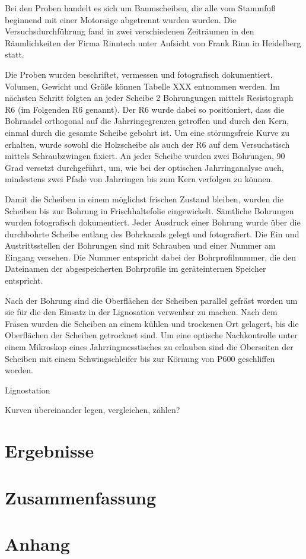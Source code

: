 \documentclass[a4paper, halfparskip]{article}
\def\SymbReg{\textsuperscript{\textregistered}}
\begin{document}
Bei den Proben handelt es sich um Baumscheiben, die alle vom Stammfuß
beginnend mit einer Motorsäge abgetrennt wurden wurden. Die
Versuchsdurchführung fand in zwei verschiedenen Zeiträumen in den
Räumlichkeiten der Firma Rinntech unter Aufsicht von Frank Rinn in Heidelberg
statt. 

Die Proben wurden beschriftet, vermessen und fotografisch dokumentiert.
Volumen, Gewicht und Größe können Tabelle XXX entnommen werden. Im nächsten
Schritt folgten an jeder Scheibe 2 Bohrungungen mittels Resistograph\SymbReg
R6 (im Folgenden R6 genannt). Der R6 wurde dabei so positioniert, dass die
Bohrnadel orthogonal auf die Jahrringegrenzen getroffen und durch den Kern,
einmal durch die gesamte Scheibe gebohrt ist. Um eine störungsfreie Kurve zu
erhalten, wurde sowohl die Holzscheibe als auch der R6 auf dem Versuchstisch
mittels Schraubzwingen fixiert. An jeder Scheibe wurden zwei Bohrungen, 90
Grad versetzt durchgeführt, um, wie bei der optischen Jahrringanalyse auch,
mindestens zwei Pfade von Jahrringen bis zum Kern verfolgen zu können. 

Damit die Scheiben in einem möglichst frischen Zustand bleiben, wurden die
Scheiben bis zur Bohrung in Frischhaltefolie eingewickelt. Sämtliche
Bohrungen wurden fotografisch dokumentiert. Jeder Ausdruck einer Bohrung wurde
über die durchbohrte Scheibe entlang des Bohrkanals gelegt und fotografiert.
Die Ein und Austrittsstellen der Bohrungen sind mit Schrauben und einer Nummer
am Eingang versehen. Die Nummer entspricht dabei der Bohrprofilnummer, die den
Dateinamen der abgespeicherten Bohrprofile im geräteinternen Speicher
entspricht.

Nach der Bohrung sind die Oberflächen der Scheiben parallel gefräst worden um
sie für die den Einsatz in der Lignosation verwenbar zu machen. Nach dem
Fräsen wurden die Scheiben an einem kühlen und trockenen Ort gelagert, bis die
Oberflächen der Scheiben getrocknet sind. Um eine optische Nachkontrolle unter
einem Mikroskop eines Jahrringmesstisches zu erlauben sind die Oberseiten der
Scheiben mit einem Schwingschleifer bis zur Körnung von P600 geschliffen
worden.

Lignostation

Kurven übereinander legen, vergleichen, zählen?

\section{Ergebnisse}
\section{Zusammenfassung}
\section{Anhang}



\end{document}
